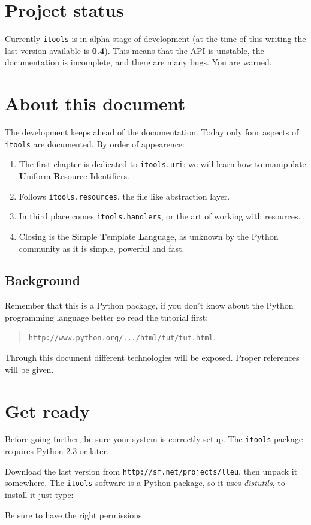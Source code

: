 \section{Project status}

Currently {\tt itools} is in alpha stage of development (at the time of
this writing the last version available is {\bf 0.4}). This means that the
API is unstable, the documentation is incomplete, and there are many bugs.
You are warned.

\section{About this document}

The development keeps ahead of the documentation. Today only four aspects
of {\tt itools} are documented. By order of appearence:

\begin{enumerate}
  \item The first chapter is dedicated to {\tt itools.uri}: we will learn how
    to manipulate {\bf U}niform {\bf R}esource {\bf I}dentifiers.

  \item Follows {\tt itools.resources}, the file like abstraction layer.

  \item In third place comes {\tt itools.handlers}, or the art of working
    with resources.

  \item Closing is the {\bf S}imple {\bf T}emplate {\bf L}anguage, as unknown
    by the Python community as it is simple, powerful and fast.
\end{enumerate}


\subsection{Background}

Remember that this is a Python package, if you don't know about the Python
programming language better go read the tutorial first:

\begin{quote}
  {\tt http://www.python.org/.../html/tut/tut.html}.
\end{quote}

Through this document different technologies will be exposed. Proper
references will be given.

\section{Get ready}

Before going further, be sure your system is correctly setup. The {\tt itools}
package requires Python 2.3 or later.

Download the last version from {\tt http://sf.net/projects/lleu}, then
unpack it somewhere. The {\tt itools} software is a Python package, so
it uses {\em distutils}, to install it just type:


Be sure to have the right permissions.

